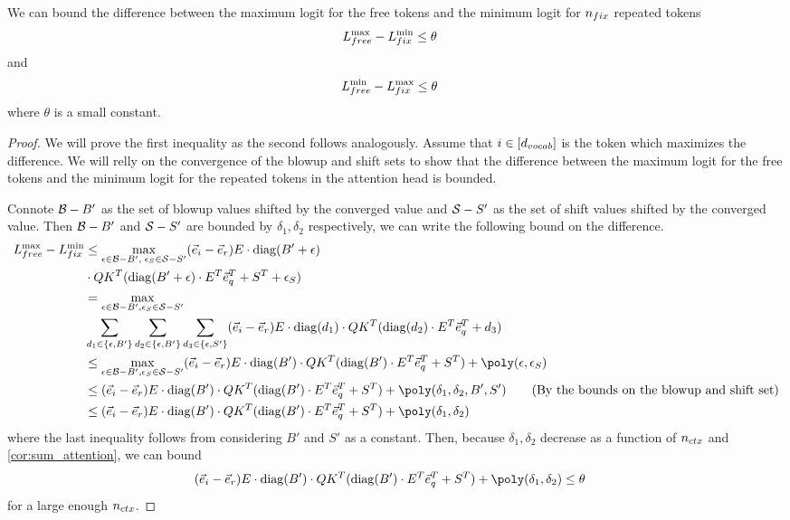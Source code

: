 \begin{lemma}
	\label{lem:bound_diff}
	We can bound the difference between the maximum logit for the free tokens and the minimum logit for $n_{fix}$ repeated tokens
	\begin{align}
		L_{free}^{\max} - L_{fix}^{\min} &\leq \theta
	\end{align}
	and
	\begin{align}
		L_{free}^{\min} - L_{fix}^{\max} &\leq \theta
	\end{align}
	where $\theta$ is a small constant.
\end{lemma}
\begin{proof}
	We will prove the first inequality as the second follows analogously.
	Assume that $i \in [{d_{vocab}}]$ is the token which maximizes the difference.
	We will relly on the convergence of the blowup and shift sets to show that the difference between the maximum logit for the free tokens and the minimum logit for the repeated tokens in the attention head is bounded.
	
	Connote $\mathcal{B} - B'$ as the set of blowup values shifted by the converged value and $\mathcal{S} - S'$ as the set of shift values shifted by the converged value.
	Then $\mathcal{B} - B'$ and $\mathcal{S} - S'$ are bounded by $\delta_1, \delta_2$ respectively, we can write the following bound on the difference.
	\begin{align*}
		\logFMax - \logRMin &\leq \max_{\eps \in \blowupSet - B', \; \eps_S \in \shiftSet - S'} (\vec{e}_i - \vecDes) E \cdot \diag(B' + \eps) \\ & \cdot Q K^T (\diag(B' + \eps) \cdot E^T \vecQuery^T + S^T + \eps_S) \\
					   &= \max_{\eps \in \blowupSet - B', \eps_S \in \shiftSet - S'} \\& \sum_{d_1 \in \{\eps, B'\}} \sum_{d_2 \in \{\eps, B'\}} \sum_{d_3 \in \{\eps, S'\}} (\vec{e}_i - \vecDes) E \cdot \diag(d_1) \cdot Q K^T (\diag(d_2) \cdot E^T \vecQuery^T + d_3) \\
					   &\leq \max_{\eps \in \blowupSet - B', \eps_S \in \shiftSet - S'} (\vec{e}_i - \vecDes) E \cdot \diag(B') \cdot Q K^T (\diag(B') \cdot E^T \vecQuery^T + S^T) + \poly(\eps, \eps_S)\\
					   &\leq (\vec{e}_i - \vecDes) E \cdot \diag(B')  \cdot Q K^T (\diag(B') \cdot E^T \vecQuery^T + S^T) + \poly(\delta_1, \delta_2, B', S')
                       \tag{By the bounds on the blowup and shift set}
                       \\
					   &\leq (\vec{e}_i - \vecDes) E \cdot \diag(B')  \cdot Q K^T (\diag(B') \cdot E^T \vecQuery^T + S^T) + \poly(\delta_1, \delta_2)
	\end{align*}
	where the last inequality follows from considering $B'$ and $S'$ as a constant.
	Then, because $\delta_1, \delta_2$ decrease as a function of ${n_{ctx}}$ and \cref{cor:sum_attention},
	we can bound
	\begin{align*}
		&(\vec{e}_i - \vecDes) E \cdot \diag(B') 
        \cdot 
        Q K^T (\diag(B') \cdot E^T \vecQuery^T + S^T) + \poly(\delta_1, \delta_2) \leq \theta
	\end{align*}
	for a large enough ${n_{ctx}}$.
\end{proof}


